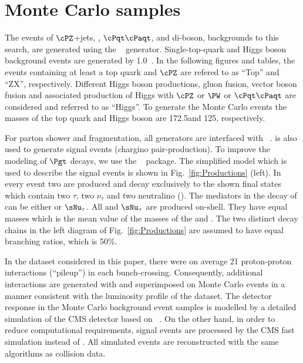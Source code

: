 \section{Monte Carlo samples}
\label{sect:MCSamples}
The events of $\cPZ$+jets, \wjets, $\cPqt\cPaqt$, and di-boson, 
backgrounds to this search, are generated using the ~\cite{Alwall:2011uj} generator. 
Single-top-quark and Higgs boson background events are generated by {\POWHEG} 1.0~\cite{Nason:2004rx,Frixione:2007vw,Alioli:2009je,Alioli:2010xd}.
In the following figures and tables, the events containing at least a top quark and $\cPZ$ are refered to as ``Top'' and ``ZX'', respectively. 
Different Higgs boson productions, gluon fusion, vector boson fusion and associated production of Higgs with $\cPZ$ or $\PW$ or $\cPqt\cPaqt$ are considered and referred to as ``Higgs''. To generate the Monte Carlo events the masses of the top quark and Higgs boson are 172.5\GeV and 125\GeV, respectively.

For parton shower and fragmentation, all generators are interfaced with ~\cite{Sjostrand:2006za}.
\PYTHIA is also used to generate signal events (chargino pair-production). To improve the modeling of $\Pgt$ decays, 
we use the \TAUOLA~\cite{Davidson:2010rw} package. The simplified model which is used to describe the signal events is shown 
in Fig.~\ref{fig:Productions} (left). In every event two  \chione 
are produced and decay exclusively to the shown final states which contain two $\tau$, two $\nu_{\tau}$ and two neutralino (\PSGczDo).
The mediators in the decay of \chione can be either \sTau or $\sNu_{\tau}$. All  \sTau and $\sNu_{\tau}$ 
are produced  on-shell. They have equal masses which is the mean value of the masses of the \chione   and \PSGczDo.
The two distinct decay chains in the left diagram of Fig.~\ref{fig:Productions} are assumed to have equal branching ratios, which is 50\%.


In the dataset considered in this paper,
there were on average 21 proton-proton interactions (``pileup'') in each bunch-crossing.
Consequently, additional interactions are generated with \PYTHIA and superimposed on Monte Carlo events in a manner consistent with the
luminosity profile of the dataset.
The detector response in the Monte Carlo background event samples is modelled by a
detailed simulation
of the CMS detector based on {\GEANTfour}~\cite{Agostinelli:2002hh}.  
On the other hand, in order to reduce  computational requirements, signal events 
are processed by the CMS fast simulation \cite{Abdullin:2011zz} instead of {\GEANTfour}. 
All simulated events are reconstructed with the same algorithms as collision data.

